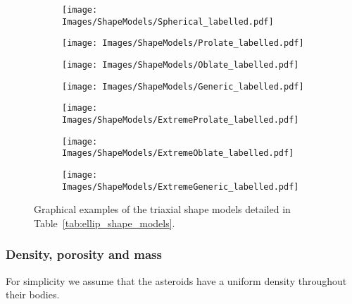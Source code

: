 \documentclass[fleqn,usenatbib]{mnras}
\begin{document}
\begin{figure}
    \begin{subfigure}[b]{.5\linewidth}
        \centering
        \texttt{[image: Images/ShapeModels/Spherical\_labelled.pdf]}
    \end{subfigure}%
    \begin{subfigure}[b]{.5\linewidth}
        \centering
        \texttt{[image: Images/ShapeModels/Prolate\_labelled.pdf]}
    \end{subfigure}
    \begin{subfigure}[b]{.5\linewidth}
        \centering
        \texttt{[image: Images/ShapeModels/Oblate\_labelled.pdf]}
    \end{subfigure}
    \begin{subfigure}[b]{.5\linewidth}
        \centering
        \texttt{[image: Images/ShapeModels/Generic\_labelled.pdf]}
    \end{subfigure}
    \begin{subfigure}[b]{.5\linewidth}
        \centering
        \texttt{[image: Images/ShapeModels/ExtremeProlate\_labelled.pdf]}
    \end{subfigure}
    \begin{subfigure}[b]{.5\linewidth}
        \centering
        \texttt{[image: Images/ShapeModels/ExtremeOblate\_labelled.pdf]}
    \end{subfigure}
    \begin{subfigure}[b]{\linewidth}
        \centering
        \texttt{[image: Images/ShapeModels/ExtremeGeneric\_labelled.pdf]}
    \end{subfigure}
    \caption{Graphical examples of the triaxial shape models detailed in Table~\ref{tab:ellip_shape_models}.}
    \label{fig:shape_models}
\end{figure}

\subsubsection{Density, porosity and mass}  \label{subsubsec:ast_density} 
For simplicity we assume that the asteroids have a uniform density throughout their bodies.
\end{document}
